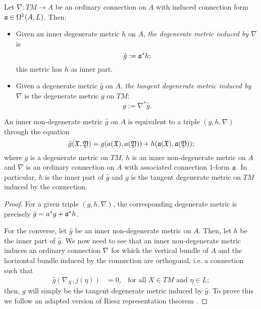 \begin{definition}
Let $\nabla: TM \to A$ be an ordinary connection on $A$ with induced connection form $\mathfrak{a} \in \Omega^1(A, L)$. Then:
    \begin{itemize}
    
    \item Given an inner degenerate metric $h$ on $A$, \emph{the degenerate metric induced by $\nabla$} is
    \begin{equation}
        \hat g := \mathfrak{a}^* h;
    \end{equation}
    this metric has $h$ as inner part.
    
    \item Given a degenerate metric $\hat g$ on $A$, \emph{the tangent degenerate metric induced by $\nabla$} is the degenerate metric $g$ on $TM$:
    \begin{equation}
        g := \nabla^* \hat g.
    \end{equation}
    
    \end{itemize}
\end{definition}

\begin{theorem}
An inner non-degenerate metric $\hat g$ on $A$ is equivalent to a triple $(g, h, \nabla)$ through the equation
\begin{equation}
    \hat g(\mathfrak{X}, \mathfrak{Y}) = g(a(\mathfrak{X}), a(\mathfrak{Y})) + h(\mathfrak{a}(\mathfrak{X}), \mathfrak{a}(\mathfrak{Y}));
\end{equation}
where $g$ is a degenerate metric on $TM$, $h$ is an inner non-degenerate metric on $A$ and $\nabla$ is an ordinary connection on $A$ with associated connection $1$-form $\mathfrak{a}$. In particular, $h$ is the inner part of $\hat g$ and $g$ is the tangent degenerate metric on $TM$ induced by the connection.
\end{theorem}
\begin{proof}
For a given triple $(g, h, \nabla)$, the corresponding degenerate metric is precisely $\hat g = a^*g + \mathfrak{a}^* h$.

For the converse, let $\hat g$ be an inner non-degenerate metric on $A$. Then, let $h$ be the inner part of $\hat g$. We now need to see that an inner non-degenerate metric induces an ordinary connection $\nabla$ for which the vertical bundle of $A$ and the horizontal bundle induced by the connection are orthogonal, i.e. a connection such that
\begin{align}
    \hat g(\nabla_X, j(\eta)) &= 0,& \text{for all $X \in TM$ and $\eta \in L$};
\end{align} then, $g$ will simply be the tangent degenerate metric induced by $\hat g$. To prove this we follow an adapted version of Riesz representation theorem \todo{}.
\end{proof}


